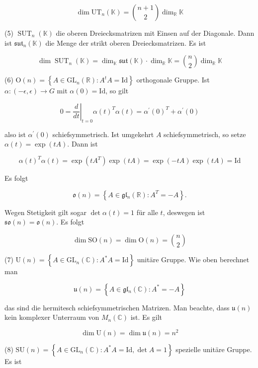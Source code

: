 \documentclass[10pt, letterpaper]{article}
\begin{document}
$$
\operatorname{dim} \mathrm{UT}_{n}(\mathbb{K})=\binom{n+1}{2} \operatorname{dim}_{\mathbb{R}} \mathbb{K}
$$

(5) $\operatorname{SUT}_{n}(\mathbb{K})$ die oberen Dreiecksmatrizen mit Einsen auf der Diagonale. Dann ist $\mathfrak{s u t}_{n}(\mathbb{K})$ die Menge der strikt oberen Dreiecksmatrizen. Es ist

$$
\operatorname{dim} \operatorname{SUT}_{n}(\mathbb{K})=\operatorname{dim}_{\mathbb{K}} \mathfrak{s u t}(\mathbb{K}) \cdot \operatorname{dim}_{\mathbb{R}} \mathbb{K}=\binom{n}{2} \operatorname{dim}_{\mathbb{R}} \mathbb{K}
$$

(6) $\mathrm{O}(n)=\left\{A \in \mathrm{GL}_{n}(\mathbb{R}): A^{t} A=\mathrm{Id}\right\}$ orthogonale Gruppe. Ist $\alpha:(-\epsilon, \epsilon) \rightarrow G$ mit $\alpha(0)=\mathrm{Id}$, so gilt

$$
0=\left.\frac{d}{d t}\right|_{t=0} \alpha(t)^{T} \alpha(t)=\alpha^{\prime}(0)^{T}+\alpha^{\prime}(0)
$$

also ist $\alpha^{\prime}(0)$ schiefsymmetrisch. Ist umgekehrt $A$ schiefsymmetrisch, so setze $\alpha(t)=\exp (t A)$. Dann ist

$$
\alpha(t)^{T} \alpha(t)=\exp \left(t A^{T}\right) \exp (t A)=\exp (-t A) \exp (t A)=\mathrm{Id}
$$

Es folgt

$$
\mathfrak{o}(n)=\left\{A \in \mathfrak{g} \mathfrak{l}_{n}(\mathbb{R}): A^{T}=-A\right\} .
$$

Wegen Stetigkeit gilt sogar $\operatorname{det} \alpha(t)=1$ für alle $t$, deswegen ist $\mathfrak{s o}(n)=\mathfrak{o}(n)$. Es folgt

$$
\operatorname{dim} \mathrm{SO}(n)=\operatorname{dim} \mathrm{O}(n)=\binom{n}{2}
$$

(7) $\mathrm{U}(n)=\left\{A \in \mathrm{GL}_{n}(\mathbb{C}): A^{*} A=\mathrm{Id}\right\}$ unitäre Gruppe. Wie oben berechnet man

$$
\mathfrak{u}(n)=\left\{A \in \mathfrak{g} \mathfrak{l}_{n}(\mathbb{C}): A^{*}=-A\right\}
$$

das sind die hermitesch schiefsymmetrischen Matrizen. Man beachte, dass $\mathfrak{u}(n)$ kein komplexer Unterraum von $M_{n}(\mathbb{C})$ ist. Es gilt

$$
\operatorname{dim} \mathrm{U}(n)=\operatorname{dim} \mathfrak{u}(n)=n^{2}
$$

(8) $\mathrm{SU}(n)=\left\{A \in \mathrm{GL}_{n}(\mathbb{C}): A^{*} A=\mathrm{Id}, \operatorname{det} A=1\right\}$ spezielle unitäre Gruppe. Es ist
\end{document}

